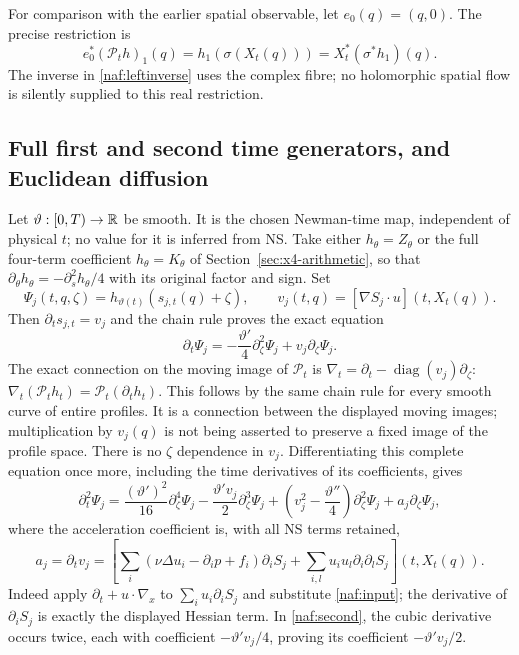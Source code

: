 For comparison with the earlier spatial observable, let
$e_0(q)=(q,0)$. The precise restriction is
\[
 e_0^*(\mathcal P_th)_1(q)=h_1(\sigma(X_t(q)))
     =X_t^*(\sigma^*h_1)(q).
\]
The inverse in \eqref{naf:leftinverse} uses the complex fibre; no
holomorphic spatial flow is silently supplied to this real restriction.

\subsection{Full first and second time generators, and Euclidean diffusion}

Let $\vartheta:[0,T)\to\mathbb R$ be smooth. It is the chosen Newman-time
map, independent of physical $t$; no value for it is inferred from NS.
Take either $h_\theta=Z_\theta$ or the full four-term coefficient
$h_\theta=K_\theta$ of Section~\ref{sec:x4-arithmetic}, so that
$\partial_\theta h_\theta=-\partial_s^2h_\theta/4$ with its original
factor and sign. Set
\[
 \Psi_j(t,q,\zeta)=h_{\vartheta(t)}(s_{j,t}(q)+\zeta),\qquad
 v_j(t,q)=[\nabla S_j\cdot u](t,X_t(q)).
\]
Then $\partial_ts_{j,t}=v_j$ and the chain rule proves the exact equation
\begin{equation}
 \partial_t\Psi_j=-\frac{\vartheta'}4\partial_\zeta^2\Psi_j
                      +v_j\partial_\zeta\Psi_j.
 \label{naf:first}
\end{equation}
The exact connection on the moving image of $\mathcal P_t$ is
$\nabla_t=\partial_t-\operatorname{diag}(v_j)\partial_\zeta$:
$\nabla_t(\mathcal P_t h_t)=\mathcal P_t(\partial_t h_t)$.
This follows by the same chain rule for every smooth curve of entire
profiles. It is a connection between the displayed moving images;
multiplication by $v_j(q)$ is not being asserted to preserve a fixed
image of the profile space.
There is no $\zeta$ dependence in $v_j$. Differentiating this complete
equation once more, including the time derivatives of its coefficients,
gives
\begin{equation}
 \partial_t^2\Psi_j=
 \frac{(\vartheta')^2}{16}\partial_\zeta^4\Psi_j
 -\frac{\vartheta'v_j}{2}\partial_\zeta^3\Psi_j
 +\left(v_j^2-\frac{\vartheta''}{4}\right)\partial_\zeta^2\Psi_j
 +a_j\partial_\zeta\Psi_j,
 \label{naf:second}
\end{equation}
where the acceleration coefficient is, with all NS terms retained,
\begin{equation}
 a_j=\partial_tv_j=
 \left[\sum_i(\nu\Delta u_i-\partial_i p+f_i)\partial_i S_j
             +\sum_{i,l}u_i u_l\partial_i\partial_l S_j\right](t,X_t(q)).
 \label{naf:accel}
\end{equation}
Indeed apply $\partial_t+u\cdot\nabla_x$ to
$\sum_i u_i\partial_iS_j$ and substitute \eqref{naf:input}; the
derivative of $\partial_iS_j$ is exactly the displayed Hessian term.
In \eqref{naf:second}, the cubic derivative occurs twice, each with
coefficient $-\vartheta'v_j/4$, proving its coefficient $-\vartheta'v_j/2$.

